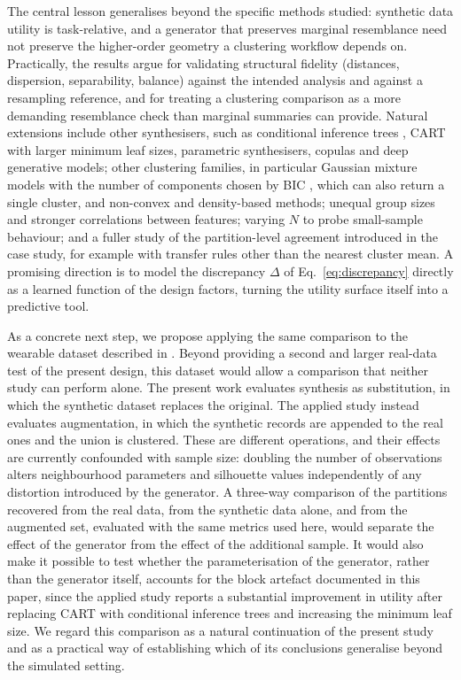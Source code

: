 \documentclass[pdflatex,referee]{sn-jnl}
\begin{document}
The central lesson generalises beyond the specific methods studied: synthetic
data utility is task-relative, and a generator that preserves marginal
resemblance need not preserve the higher-order geometry a clustering workflow
depends on. Practically, the results argue for validating structural fidelity
(distances, dispersion, separability, balance) against the intended analysis
and against a resampling reference, and for treating a clustering comparison
as a more demanding resemblance check than marginal summaries can provide.
Natural extensions include other synthesisers, such as conditional inference
trees \citep{hothorn2006}, CART with larger minimum leaf sizes, parametric
synthesisers, copulas and deep generative models; other clustering families,
in particular Gaussian mixture models with the number of components chosen by
BIC \citep{fraley2002,scrucca2016}, which can also return a single cluster, and
non-convex and density-based methods; unequal group sizes and stronger
correlations between features; varying $N$ to probe small-sample behaviour;
and a fuller study of the partition-level agreement introduced in the case
study, for example with transfer rules other than the nearest cluster mean. A promising direction
is to model the discrepancy $\Delta$ of Eq.~\eqref{eq:discrepancy} directly as
a learned function of the design factors, turning the utility surface itself
into a predictive tool.

As a concrete next step, we propose applying the same comparison to the
wearable dataset described in
\citet{vidiella2025}. Beyond providing a second and larger real-data test of the present design, this dataset
would allow a comparison that neither study can perform alone. The present work
evaluates synthesis as substitution, in which the synthetic dataset replaces
the original. The applied study instead evaluates augmentation, in which the
synthetic records are appended to the real ones and the union is clustered.
These are different operations, and their effects are currently confounded
with sample size: doubling the number of observations alters neighbourhood
parameters and silhouette values independently of any distortion introduced by
the generator. A three-way comparison of the partitions recovered from the real
data, from the synthetic data alone, and from the augmented set, evaluated with
the same metrics used here, would separate the effect of the generator from
the effect of the additional sample. It would also make it possible to test
whether the parameterisation of the generator, rather than the generator
itself, accounts for the block artefact documented in this paper, since the
applied study reports a substantial improvement in utility after replacing
CART with conditional inference trees \citep{hothorn2006} and increasing the
minimum leaf size. We regard this comparison as a natural continuation of the
present study and as a practical way of establishing which of its conclusions
generalise beyond the simulated setting.
\end{document}
